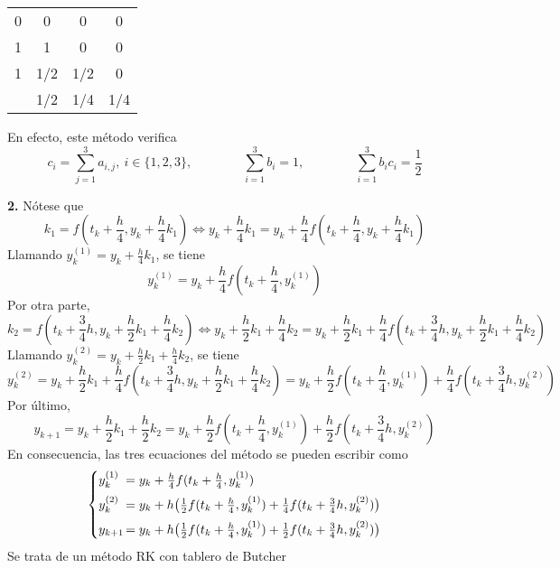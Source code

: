 \documentclass[11pt]{report}
\begin{document}
\begin{center}
    \setlength\extrarowheight{2.5pt}
    \begin{tabular}{c|ccc}
        0 & 0 & 0 & 0 \\
        1 & 1 & 0 & 0 \\
        1 & 1/2  & 1/2  & 0 \\ \hline
        & 1/2 & 1/4 & 1/4
    \end{tabular}
    \end{center}

En efecto, este método verifica
\[c_i = \sum_{j=1}^3a_{i,j}, \ i \in \{1,2,3\}, \qquad \qquad \sum_{i=1}^3 b_i = 1, \qquad \qquad \sum_{i=1}^3b_ic_i = \frac{1}{2}\]

\textbf{2.} Nótese que
\[\textstyle k_1 = f\left(t_k+\frac{h}{4},y_k+\frac{h}{4}k_1\right) \iff y_k+\frac{h}{4}k_1 = y_k+\frac{h}{4}f\left(t_k+\frac{h}{4},y_k+\frac{h}{4}k_1\right)\]
Llamando $y_k^{(1)} = y_k+\frac{h}{4}k_1$, se tiene
\[\textstyle y_k^{(1)} = y_k+\frac{h}{4}f(t_k+\frac{h}{4},y_k^{(1)})\]
Por otra parte,
\[\textstyle k_2 = f\left(t_k+\frac{3}{4}h, y_k+\frac{h}{2}k_1+\frac{h}{4}k_2\right) \iff y_k+\frac{h}{2}k_1+\frac{h}{4}k_2 = y_k+\frac{h}{2}k_1+\frac{h}{4}f\left(t_k+\frac{3}{4}h, y_k+\frac{h}{2}k_1+\frac{h}{4}k_2\right)
\]
Llamando $y_k^{(2)} = y_k+\frac{h}{2}k_1+\frac{h}{4}k_2$, se tiene
\[\textstyle
    y_k^{(2)} =  y_k+\frac{h}{2}k_1+\frac{h}{4}f\left(t_k+\frac{3}{4}h, y_k+\frac{h}{2}k_1+\frac{h}{4}k_2\right) =  y_k+\frac{h}{2}f\left(t_k+\frac{h}{4},y_k^{(1)}\right)+\frac{h}{4}f\left(t_k+\frac{3}{4}h, y_k^{(2)}\right)
\]
Por último,
\[\textstyle y_{k+1}=y_k+\frac{h}{2}k_1+\frac{h}{2}k_2 = y_k+\frac{h}{2}f\left(t_k+\frac{h}{4},y_k^{(1)}\right)+\frac{h}{2}f\left(t_k+\frac{3}{4}h,y_k^{(2)}\right)\]
En consecuencia, las tres ecuaciones del método se pueden escribir como 
\[ \textstyle \begin{cases}
     y_k^{(1)}  &\hspace{-3mm}= y_k+\frac{h}{4}f(t_k+\frac{h}{4},y_k^{(1)}) \\[5pt]
     y_k^{(2)} &\hspace{-3mm}= y_k+h\bigl(\frac{1}{2}f(t_k+\frac{h}{4},y_k^{(1)})+\frac{1}{4}f(t_k+\frac{3}{4}h,y_k^{(2)})\bigr) \\[5pt]
     y_{k+1} &\hspace{-3mm}= y_k+h\bigl(\frac{1}{2}f(t_k+\frac{h}{4},y_k^{(1)})+\frac{1}{2}f(t_k+\frac{3}{4}h,y_k^{(2)})\bigr) \\
\end{cases} \]
Se trata de un método RK con tablero de Butcher
\end{document}
